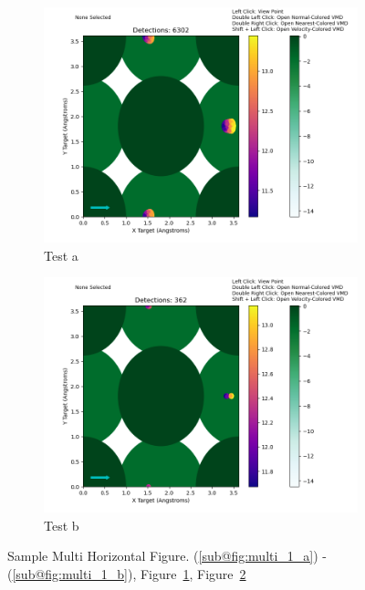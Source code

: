 \documentclass[12pt]{article}
\begin{document}
\begin{figure}[ht]
    \begin{subfigure}{.495\textwidth}
      \centering
      \includegraphics[width=1\linewidth]{fig_1.png}  
      \caption{Test a}
      \label{fig:multi_1_a}
    \end{subfigure}
    \begin{subfigure}{.495\textwidth}
      \centering
      \includegraphics[width=1\linewidth]{fig_2.png}  
      \caption{Test b}
      \label{fig:multi_1_b}
    \end{subfigure}
    \caption{Sample Multi Horizontal Figure. (\ref{sub@fig:multi_1_a}) - (\ref{sub@fig:multi_1_b}), Figure~\ref{fig:multi_1_a}, Figure~\ref{fig:multi_1_b}}
    \label{fig:multi_1}
\end{figure}
\end{document}
